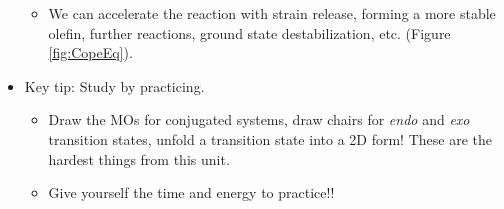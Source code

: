 \documentclass[../notes.tex]{subfiles}
\begin{document}
\begin{itemize}
\begin{itemize}
\begin{itemize}
        \end{itemize}
        \item We can accelerate the reaction with strain release, forming a more stable olefin, further reactions, ground state destabilization, etc. (Figure \ref{fig:CopeEq}).
    \end{itemize}
    \item Key tip: Study by practicing.
    \begin{itemize}
        \item Draw the MOs for conjugated systems, draw chairs for \emph{endo} and \emph{exo} transition states, unfold a transition state into a 2D form! These are the hardest things from this unit.
        \item Give yourself the time and energy to practice!!
    \end{itemize}
\end{itemize}
\end{document}
